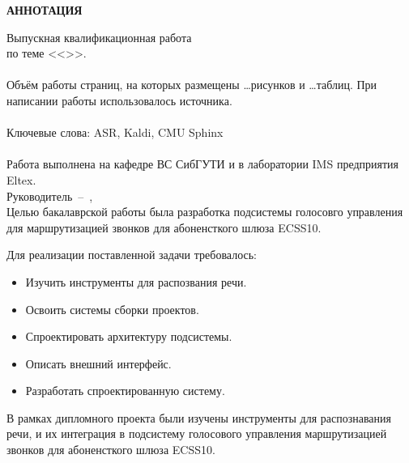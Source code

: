\begin{center}
    \bf
    АННОТАЦИЯ
\end{center}


Выпускная квалификационная работа \fioa \\
по теме <<\topicname>>.\\
\hfill \\
Объём работы \pageref{LastPage} страниц, на которых размещены \dots рисунков
и \dots таблиц. При написании работы использовалось  источника. \\
\hfill \\
Ключевые слова: ASR, Kaldi, CMU Sphinx \\
\hfill \\
Работа выполнена на кафедре ВС СибГУТИ и в лаборатории IMS предприятия Eltex. \\
Руководитель~--~\thead, \\


Целью бакалаврской работы была разработка подсистемы голосовго управления
для маршрутизацией звонков для абоненсткого шлюза ECSS10.


Для реализации поставленной задачи требовалось:

\begin{itemize}
    \item Изучить инструменты для распозвания речи.
    \item Освоить системы сборки проектов.
    \item Спроектировать архитектуру подсистемы.
    \item Описать внешний интерфейс.
    \item Разработать спроектированную систему.
\end{itemize}


В рамках дипломного проекта были изучены инструменты для распознавания речи, и
их интеграция в подсистему голосового управления маршрутизацией звонков для
абоненсткого шлюза ECSS10.


\thispagestyle{empty}
\newpage
